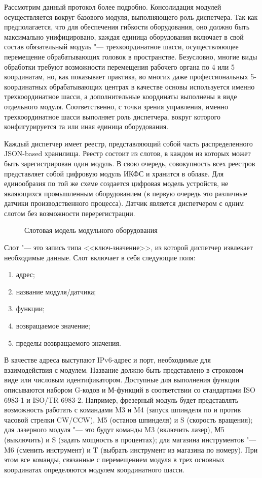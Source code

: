 Рассмотрим данный протокол более подробно. Консолидация модулей осуществляется вокруг базового модуля, выполняющего роль диспетчера. Так как предполагается, что для обеспечения гибкости оборудования, оно должно быть максимально унифицировано, каждая единица оборудования включает в свой состав обязательный модуль "--- трехкоординатное шасси, осуществляющее перемещение обрабатывающих головок в пространстве. Безусловно, многие виды обработки требуют возможности перемещения рабочего органа по 4 или 5 координатам, но, как показывает практика, во многих даже профессиональных 5-координатных обрабатывающих центрах в качестве основы используется именно трехкоординатное шасси, а дополнительные координаты выполнены в виде отдельного модуля. Соответственно, с точки зрения управления, именно трехкоординатное шасси выполняет роль диспетчера, вокруг которого конфигурируется та или иная единица оборудования. 

Каждый диспетчер имеет реестр, представляющий собой часть распределенного JSON-based хранилища. Реестр состоит из слотов, в каждом из которых может быть зарегистрирован один модуль. В свою очередь, совокупность всех реестров представляет собой цифровую модуль ИКФС и хранится в облаке. Для единообразия по той же схеме создается цифровая модель устройств, не являющихся промышленным оборудованием (в первую очередь это различные датчики производственного процесса). Датчик является диспетчером с одним слотом без возможности перерегистрации.

\begin{figure}[ht]
	\caption{Слотовая модель модульного оборудования}\label{fig:main-arch}
\end{figure}

Слот "--- это запись типа <<ключ-значение>>, из которой диспетчер извлекает необходимые данные. Слот включает в себя следующие поля:

\begin{enumerate}
	\item адрес;
	\item название модуля/датчика;
	\item функции;
	\item возвращаемое значение;
	\item пределы возвращаемого значения.
\end{enumerate}

В качестве адреса выступают IPv6-адрес и порт, необходимые для взаимодействия с модулем. Название должно быть представлено в строковом виде или числовым идентификатором. Доступные для выполнения функции описываются набором G-кодов и М-функций в соответствии со стандартами ISO 6983-1 и ISO/TR 6983-2.
Например, фрезерный модуль будет представлять возможность работать с командами M3 и M4 (запуск шпинделя по и против часовой стрелки CW/CCW), M5 (останов шпинделя) и S (скорость вращения); для лазерного модуля "--- это будут команды M3 (включить лазер), М5 (выключить) и S (задать мощность в процентах); для магазина инструментов "--- M6 (сменить инструмент) и T (выбрать инструмент из магазина по номеру).  При этом все команды, связанные с перемещением модуля в трех основных координатах определяются модулем координатного шасси.

